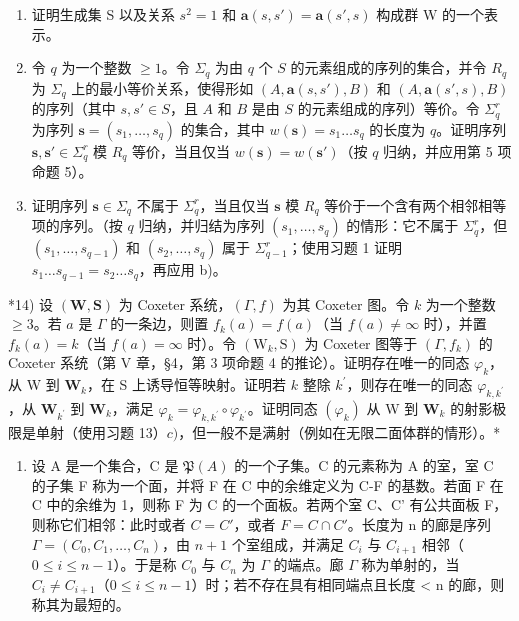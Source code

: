 \begin{enumerate}
\def\labelenumi{\alph{enumi})}
\item
  证明生成集 S 以及关系 \(s^{2}=1\) 和 \(\mathbf{a}(s,s')=\mathbf{a}(s',s)\) 构成群 W 的一个表示。
\item
  令 \(q\) 为一个整数 \(\geqslant 1\)。令 \(\Sigma_q\) 为由 \(q\) 个 \(S\) 的元素组成的序列的集合，并令 \(R_q\) 为 \(\Sigma_q\) 上的最小等价关系，使得形如 \((A, \mathbf{a}(s, s'), B)\) 和 \((A, \mathbf{a}(s', s), B)\) 的序列（其中 \(s, s' \in S\)，且 \(A\) 和 \(B\) 是由 \(S\) 的元素组成的序列）等价。令 \(\Sigma_q^r\) 为序列 \(\mathbf{s} = (s_1, \ldots, s_q)\) 的集合，其中 \(w(\mathbf{s}) = s_1 \ldots s_q\) 的长度为 \(q\)。证明序列 \(\mathbf{s}, \mathbf{s}' \in \Sigma_q^r\) 模 \(R_q\) 等价，当且仅当 \(w(\mathbf{s}) = w(\mathbf{s}')\)（按 \(q\) 归纳，并应用第 5 项命题 5）。
\item
  证明序列 \(\mathbf{s} \in \Sigma_q\) 不属于 \(\Sigma_q^r\)，当且仅当 \(\mathbf{s}\) 模 \(R_q\) 等价于一个含有两个相邻相等项的序列。（按 \(q\) 归纳，并归结为序列 \((s_1, \ldots, s_q)\) 的情形：它不属于 \(\Sigma_q^r\)，但 \((s_1, \ldots, s_{q-1})\) 和 \((s_2, \ldots, s_q)\) 属于 \(\Sigma_{q-1}^r\)；使用习题 1 证明 \(s_1 \ldots s_{q-1} = s_2 \ldots s_q\)，再应用 b)。
\end{enumerate}

*14) 设 \((\mathbf{W},\mathbf{S})\) 为 Coxeter 系统，\((\Gamma ,f)\) 为其 Coxeter 图。令 \(k\) 为一个整数 \(\geqslant 3\)。若 \(a\) 是 \(\Gamma\) 的一条边，则置 \(f_{k}(a) = f(a)\)（当 \(f(a)\neq \infty\) 时），并置 \(f_{k}(a) = k\)（当 \(f(a) = \infty\) 时）。令 \((\mathrm{W}_k,\mathrm{S})\) 为 Coxeter 图等于 \((\Gamma ,f_k)\) 的 Coxeter 系统（第 V 章，§4，第 3 项命题 4 的推论）。证明存在唯一的同态 \(\varphi_{k}\)，从 W 到 \(\mathbf{W}_k\)，在 S 上诱导恒等映射。证明若 \(k\) 整除 \(k^{\prime}\)，则存在唯一的同态 \(\varphi_{k,k^{\prime}}\)，从 \(\mathbf{W}_{k^{\prime}}\) 到 \(\mathbf{W}_k\)，满足 \(\varphi_{k} = \varphi_{k,k^{\prime}}\circ \varphi_{k^{\prime}}\)。证明同态 \((\varphi_{k})\) 从 W 到 \(\mathbf{W}_k\) 的射影极限是单射（使用习题 13）\(c)\)，但一般不是满射（例如在无限二面体群的情形）。*

\begin{enumerate}
\def\labelenumi{\arabic{enumi})}
\setcounter{enumi}{14}
\tightlist
\item
  设 A 是一个集合，C 是 \(\mathfrak{P}(A)\) 的一个子集。C 的元素称为 A 的室，室 C 的子集 F 称为一个面，并将 F 在 C 中的余维定义为 C-F 的基数。若面 F 在 C 中的余维为 1，则称 F 为 C 的一个面板。若两个室 C、C' 有公共面板 F，则称它们相邻：此时或者 \(C = C'\)，或者 \(F = C \cap C'\)。长度为 n 的廊是序列 \(\Gamma = (C_0, C_1, \ldots, C_n)\)，由 \(n + 1\) 个室组成，并满足 \(C_i\) 与 \(C_{i+1}\) 相邻（\(0 \leqslant i \leqslant n - 1\)）。于是称 \(C_0\) 与 \(C_n\) 为 \(\Gamma\) 的端点。廊 \(\Gamma\) 称为单射的，当 \(C_i \neq C_{i+1}\)（\(0 \leqslant i \leqslant n - 1\)）时；若不存在具有相同端点且长度 \textless{} n 的廊，则称其为最短的。
\end{enumerate}

